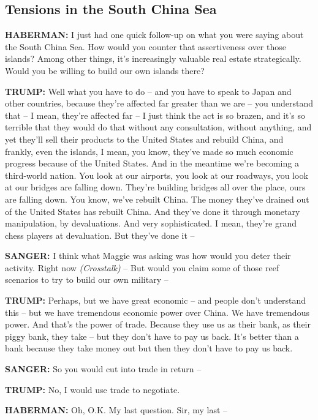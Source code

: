 \hypertarget{tensions-in-the-south-china-sea}{%
\subsection{Tensions in the South China
Sea}\label{tensions-in-the-south-china-sea}}

\textbf{HABERMAN:} I just had one quick follow-up on what you were
saying about the South China Sea. How would you counter that
assertiveness over those islands? Among other things, it's increasingly
valuable real estate strategically. Would you be willing to build our
own islands there?

\textbf{TRUMP:} Well what you have to do -- and you have to speak to
Japan and other countries, because they're affected far greater than we
are -- you understand that -- I mean, they're affected far -- I just
think the act is so brazen, and it's so terrible that they would do that
without any consultation, without anything, and yet they'll sell their
products to the United States and rebuild China, and frankly, even the
islands, I mean, you know, they've made so much economic progress
because of the United States. And in the meantime we're becoming a
third-world nation. You look at our airports, you look at our roadways,
you look at our bridges are falling down. They're building bridges all
over the place, ours are falling down. You know, we've rebuilt China.
The money they've drained out of the United States has rebuilt China.
And they've done it through monetary manipulation, by devaluations. And
very sophisticated. I mean, they're grand chess players at devaluation.
But they've done it --

\textbf{SANGER:} I think what Maggie was asking was how would you deter
their activity. Right now \emph{(Crosstalk)} -- But would you claim some
of those reef scenarios to try to build our own military --

\textbf{TRUMP:} Perhaps, but we have great economic -- and people don't
understand this -- but we have tremendous economic power over China. We
have tremendous power. And that's the power of trade. Because they use
us as their bank, as their piggy bank, they take -- but they don't have
to pay us back. It's better than a bank because they take money out but
then they don't have to pay us back.

\textbf{SANGER:} So you would cut into trade in return --

\textbf{TRUMP:} No, I would use trade to negotiate.

\textbf{HABERMAN:} Oh, O.K. My last question. Sir, my last --

